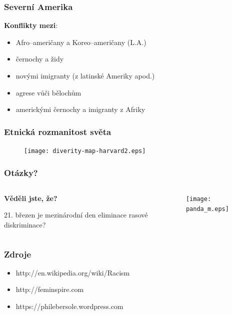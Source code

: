 \documentclass{beamer}
\begin{document}
\begin{frame}
\transwipe
{}
\frametitle{Severní Amerika}

\textbf{Konflikty mezi}:

\begin{itemize}
\item Afro--američany a Koreo--američany (L.A.)
\item černochy a židy
\item novými imigranty (z latinské Ameriky apod.)
\item agrese vůči bělochům
\item americkými černochy a imigranty z Afriky
\end{itemize}
\end{frame}

\begin{frame}
\transwipe
{}
\frametitle{Etnická rozmanitost světa}
\begin{figure}[h]
\centering
\texttt{[image: diverity-map-harvard2.eps]}
\end{figure}
\end{frame}

\begin{frame}
\transwipe
{}
\frametitle{Otázky?}
\begin{columns}
\begin{column}{0.5\textwidth}
\textbf{Věděli jste, že?}

\setlength{\leftskip}{1.3em} 21. březen je mezinárodní den eliminace rasové diskriminace?
\end{column}
\begin{column}{0.5\textwidth}
\begin{figure}[h]
\centering
\texttt{[image: panda\_m.eps]}

\end{figure}
\end{column}
\end{columns}
\end{frame}

\begin{frame}
\transwipe
{}
\frametitle{Zdroje}
\begin{itemize}
\item http://en.wikipedia.org/wiki/Racism
\item http://feminspire.com
\item https://philebersole.wordpress.com
\end{itemize}
\end{frame}
\end{document}
